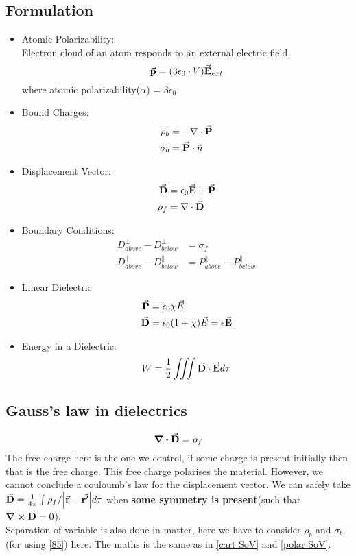\subsection{Formulation}
\begin{tcolorbox}[colback=yellow!5!white,colframe=yellow!50!black]
	\begin{itemize}
		\item Atomic Polarizability: \\
		Electron cloud of an atom responds to an external electric field
		\begin{equation}
			\va{p} = (3\epsilon_0\cdot V)\va{E}_{ext}
		\end{equation}
		where atomic polarizability($\alpha$) = $3\epsilon_0$.
		\item Bound Charges:
		\begin{align}
			\rho_b &= -\nabla\cdot\va{P} \\
			\sigma_b &= \va{P}\cdot\hat{n}
		\end{align}
		
		\item Displacement Vector:
		\begin{align}
			\va{D} &= \epsilon_0\va{E}+\va{P} \\
			\rho_f &= \nabla\cdot\va{D}
		\end{align}
		\item Boundary Conditions:
		\begin{align}
			D_{above}^{\perp} - D_{below}^{\perp} &= \sigma_f\\
			D_{above}^{\parallel}-D_{below}^{\parallel}&=	P_{above}^{\parallel}-P_{below}^{\parallel}
		\end{align}
		\item Linear Dielectric
		\begin{align}
			\va{P} &= \epsilon_0\chi\vec{E} \\
			\va{D} &= \epsilon_0(1+\chi)\vec{E} = \epsilon\va{E} \\
		\end{align}
		\item Energy in a Dielectric:
		\begin{equation}
			W = \frac{1}{2}\iiint \va{D}\cdot\va{E}d\tau
		\end{equation}
	\end{itemize}
\end{tcolorbox}

\subsection{Gauss's law in dielectrics}
\begin{equation}
	\div{\va{D}}=\rho_f
\end{equation}
The free charge here is the one we control, if some charge is present initially then that is the free charge. This free charge polarises the material. However, we cannot conclude a couloumb's law for the displacement vector. We can safely take $\va{D}=\tfrac{1}{4\pi}\int \rho_f/\abs{\va{r}-\va{r'}}d\tau$ when \textbf{some symmetry is present}(such that  $\curl{\va{D}}=0$). \\

Separation of variable is also done in matter, here we have to consider $\rho_b$ and $\sigma_b$(for using \eqref{85}) here. The maths is the same as in \ref{cart SoV} and \ref{polar SoV}.